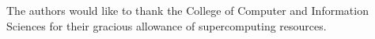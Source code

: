 \documentclass[useAMS, usenatbib]{biom}
\begin{document}
The authors would like to thank the College of Computer and Information Sciences for their gracious allowance of supercomputing resources.

 


\label{lastpage}

\end{document}
